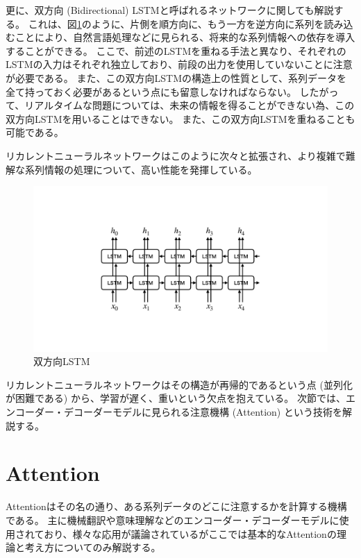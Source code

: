 更に、双方向 (Bidirectional) LSTMと呼ばれるネットワークに関しても解説する。
これは、図\ref{17BidirectionalLSTM}のように、片側を順方向に、もう一方を逆方向に系列を読み込むことにより、自然言語処理などに見られる、将来的な系列情報への依存を導入することができる。
ここで、前述のLSTMを重ねる手法と異なり、それぞれのLSTMの入力はそれぞれ独立しており、前段の出力を使用していないことに注意が必要である。
また、この双方向LSTMの構造上の性質として、系列データを全て持っておく必要があるという点にも留意しなければならない。
したがって、リアルタイムな問題については、未来の情報を得ることができない為、この双方向LSTMを用いることはできない。
また、この双方向LSTMを重ねることも可能である。

リカレントニューラルネットワークはこのように次々と拡張され、より複雑で難解な系列情報の処理について、高い性能を発揮している。

\begin{figure}[h]
 \centering
 \includegraphics[trim = 0 200 0 200, width=1.0\textwidth, clip]{Figure/2DeepLearning/17BidirectionalLSTM.png}
 \caption{双方向LSTM}
 \label{17BidirectionalLSTM}
\end{figure}

リカレントニューラルネットワークはその構造が再帰的であるという点 (並列化が困難である) から、学習が遅く、重いという欠点を抱えている。
次節では、エンコーダー・デコーダーモデルに見られる注意機構 (Attention) という技術を解説する。


\section{Attention} \label{DL:Attention}

Attention\cite{BahdanauAttention, LuongAttention}はその名の通り、ある系列データのどこに注意するかを計算する機構である。
主に機械翻訳や意味理解などのエンコーダー・デコーダーモデルに使用されており、様々な応用が議論されているがここでは基本的なAttentionの理論と考え方についてのみ解説する。

